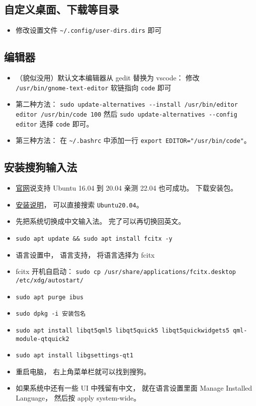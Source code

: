 \subsection{自定义桌面、下载等目录}
\begin{itemize}
\item 修改设置文件 \verb|~/.config/user-dirs.dirs| 即可
\end{itemize}

\subsection{编辑器}
\begin{itemize}
\item （貌似没用）默认文本编辑器从 gedit 替换为 vscode： 修改 \verb`/usr/bin/gnome-text-editor` 软链指向 \verb`code` 即可
\item 第二种方法： \verb|sudo update-alternatives --install /usr/bin/editor editor /usr/bin/code 100| 然后 \verb|sudo update-alternatives --config editor| 选择 \verb|code| 即可。
\item 第三种方法： 在 \verb|~/.bashrc| 中添加一行 \verb|export EDITOR="/usr/bin/code"|。
\end{itemize}

\subsection{安装搜狗输入法}
\begin{itemize}
\item \href{https://shurufa.sogou.com/linux}{官网}说支持 Ubuntu 16.04 到 20.04 亲测 22.04 也可成功。 下载安装包。
\item \href{https://shurufa.sogou.com/linux/guide}{安装说明}， 可以直接搜索 \verb|Ubuntu20.04|。
\item 先把系统切换成中文输入法。 完了可以再切换回英文。
\item \verb|sudo apt update && sudo apt install fcitx -y|
\item 语言设置中， 语言支持， 将语言选择为 fcitx
\item fcitx 开机自启动： \verb|sudo cp /usr/share/applications/fcitx.desktop /etc/xdg/autostart/|
\item \verb|sudo apt purge ibus|
\item \verb|sudo dpkg -i 安装包名|
\item \verb|sudo apt install libqt5qml5 libqt5quick5 libqt5quickwidgets5 qml-module-qtquick2|
\item \verb|sudo apt install libgsettings-qt1|
\item 重启电脑， 右上角菜单栏就可以找到搜狗。
\item 如果系统中还有一些 UI 中残留有中文， 就在语言设置里面 Manage Installed Language， 然后按 apply system-wide。
\end{itemize}

